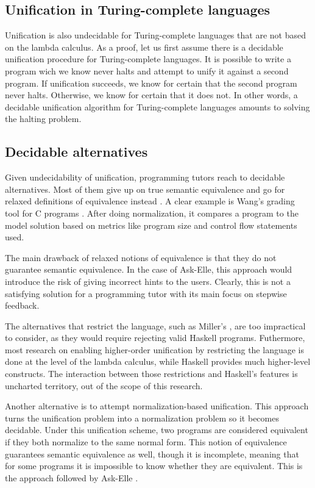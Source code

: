 \subsection{Unification in Turing-complete languages}

Unification is also undecidable for Turing-complete languages that are not based on the lambda calculus. As a proof, let us first assume there is a decidable unification procedure for Turing-complete languages. It is possible to write a program wich we know never halts and attempt to unify it against a second program. If unification succeeds, we know for certain that the second program never halts. Otherwise, we know for certain that it does not. In other words, a decidable unification algorithm for Turing-complete languages amounts to solving the halting problem.

\subsection{Decidable alternatives}

Given undecidability of unification, programming tutors reach to decidable alternatives. Most of them give up on true semantic equivalence and go for relaxed definitions of equivalence instead \cite{2016feedbackreview}. A clear example is Wang's grading tool for C programs \cite{2007wang}. After doing normalization, it compares a program to the model solution based on metrics like program size and control flow statements used.

The main drawback of relaxed notions of equivalence is that they do not guarantee semantic equivalence. In the case of Ask-Elle, this approach would introduce the risk of giving incorrect hints to the users. Clearly, this is not a satisfying solution for a programming tutor with its main focus on stepwise feedback.

The alternatives that restrict the language, such as Miller's \cite{1991miller}, are too impractical to consider, as they would require rejecting valid Haskell programs. Futhermore, most research on enabling higher-order unification by restricting the language is done at the level of the lambda calculus, while Haskell provides much higher-level constructs. The interaction between those restrictions and Haskell's features is uncharted territory, out of the scope of this research.

Another alternative is to attempt normalization-based unification. This approach turns the unification problem into a normalization problem so it becomes decidable. Under this unification scheme, two programs are considered equivalent if they both normalize to the same normal form. This notion of equivalence guarantees semantic equivalence as well, though it is incomplete, meaning that for some programs it is impossible to know whether they are equivalent. This is the approach followed by Ask-Elle \cite{2010askelle}.

